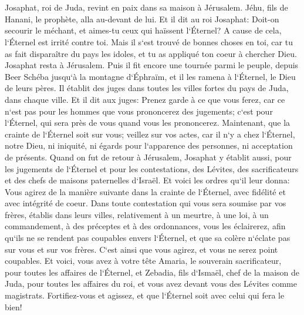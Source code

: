 \chapter{}

\verse Josaphat, roi de Juda, revint en paix dans sa maison à Jérusalem. 
\verse Jéhu, fils de Hanani, le prophète, alla au-devant de lui. Et il dit au roi Josaphat: Doit-on secourir le méchant, et aimes-tu ceux qui haïssent l`Éternel? A cause de cela, l`Éternel est irrité contre toi. 
\verse Mais il s`est trouvé de bonnes choses en toi, car tu as fait disparaître du pays les idoles, et tu as appliqué ton coeur à chercher Dieu. 
\verse Josaphat resta à Jérusalem. Puis il fit encore une tournée parmi le peuple, depuis Beer Schéba jusqu`à la montagne d`Éphraïm, et il les ramena à l`Éternel, le Dieu de leurs pères. 
\verse Il établit des juges dans toutes les villes fortes du pays de Juda, dans chaque ville. 
\verse Et il dit aux juges: Prenez garde à ce que vous ferez, car ce n`est pas pour les hommes que vous prononcerez des jugements; c`est pour l`Éternel, qui sera près de vous quand vous les prononcerez. 
\verse Maintenant, que la crainte de l`Éternel soit sur vous; veillez sur vos actes, car il n`y a chez l`Éternel, notre Dieu, ni iniquité, ni égards pour l`apparence des personnes, ni acceptation de présents. 
\verse Quand on fut de retour à Jérusalem, Josaphat y établit aussi, pour les jugements de l`Éternel et pour les contestations, des Lévites, des sacrificateurs et des chefs de maisons paternelles d`Israël. 
\verse Et voici les ordres qu`il leur donna: Vous agirez de la manière suivante dans la crainte de l`Éternel, avec fidélité et avec intégrité de coeur. 
\verse Dans toute contestation qui vous sera soumise par vos frères, établis dans leurs villes, relativement à un meurtre, à une loi, à un commandement, à des préceptes et à des ordonnances, vous les éclairerez, afin qu`ils ne se rendent pas coupables envers l`Éternel, et que sa colère n`éclate pas sur vous et sur vos frères. C`est ainsi que vous agirez, et vous ne serez point coupables. 
\verse Et voici, vous avez à votre tête Amaria, le souverain sacrificateur, pour toutes les affaires de l`Éternel, et Zebadia, fils d`Ismaël, chef de la maison de Juda, pour toutes les affaires du roi, et vous avez devant vous des Lévites comme magistrats. Fortifiez-vous et agissez, et que l`Éternel soit avec celui qui fera le bien! 

\chapter{}

